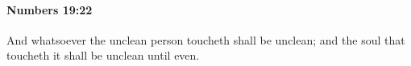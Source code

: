 
		\paragraph{Numbers 19:22} %
			\label{NUMBERS-19-22}

			And whatsoever the unclean person toucheth shall be unclean; and the soul that toucheth it shall be unclean until even.

